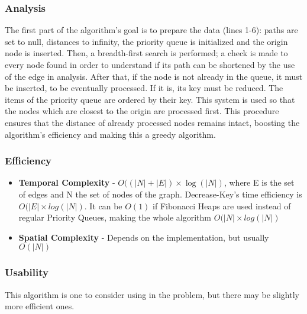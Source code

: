 

\subsubsection{Analysis}
The first part of the algorithm's goal is to prepare the data (lines 1-6): paths are set to null, distances to infinity, the priority queue is initialized and the origin node is inserted. Then, a breadth-first search is performed; a check is made to every node found in order to understand if its path can be shortened by the use of the edge in analysis. After that, if the node is not already in the queue, it must be inserted, to be eventually processed. If it is, its key must be reduced. The items of the priority queue are ordered by their key. This system is used so that the nodes which are closest to the origin are processed first. This procedure ensures that the distance of already processed nodes remains intact, boosting the algorithm's efficiency and making this a greedy algorithm. \\

\subsubsection{Efficiency}
\begin{itemize}
    \item \textbf{Temporal Complexity} - $ O((|N|+|E|) \times \log(|N|) $, where E is the set of edges and N the set of nodes of the graph. Decrease-Key's time efficiency is $ O(|E| \times log(|N|)$. It can be $ O(1) $ if Fibonacci Heaps are used instead of regular Priority Queues, making the whole algorithm $ O(|N| \times log(|N|) $ 
    \item \textbf{Spatial Complexity} - Depends on the implementation, but usually $ O(|N|) $
\end{itemize}

\subsubsection{Usability}
This algorithm is one to consider using in the problem, but there may be slightly more efficient ones.


